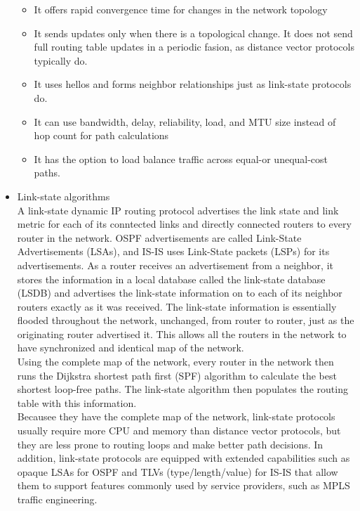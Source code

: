 \documentclass{article}
\begin{document}
\begin{itemize}
	\begin{itemize}
	\item It offers rapid convergence time for changes in the network topology
	\item It sends updates only when there is a topological change. It does not send full routing table updates in a periodic fasion, as distance vector protocols typically do.
	\item It uses hellos and forms neighbor relationships just as link-state protocols do.
	\item It can use bandwidth, delay, reliability, load, and MTU size instead of hop count for path calculations
	\item It has the option to load balance traffic across equal-or unequal-cost paths.
	\end{itemize}

\item Link-state algorithms\\

	A link-state dynamic IP routing protocol advertises the link state and link metric for each of its conntected links and directly connected routers to every router in the network. OSPF advertisements are called Link-State Advertisements (LSAs), and IS-IS uses Link-State packets (LSPs) for its advertisements. As a router receives an advertisement from a neighbor, it stores the information in a local database called the link-state database (LSDB) and advertises the link-state information on to each of its neighbor routers exactly as it was received. The link-state information is essentially flooded throughout the network, unchanged, from router to router, just as the originating router advertised it. This allows all the routers in the network to have synchronized and identical map of the network.\\

	Using the complete map of the network, every router in the network then runs the Dijkstra shortest path first (SPF) algorithm to calculate the best shortest loop-free paths. The link-state algorithm then populates the routing table with this information.\\

	Becausee they have the complete map of the network, link-state protocols usually require more CPU and memory than distance vector protocols, but they are less prone to routing loops and make better path decisions. In addition, link-state protocols are equipped with extended capabilities such as opaque LSAs for OSPF and TLVs (type/length/value) for IS-IS that allow them to support features commonly used by service providers, such as MPLS traffic engineering.\\


\end{itemize}
\end{document}
